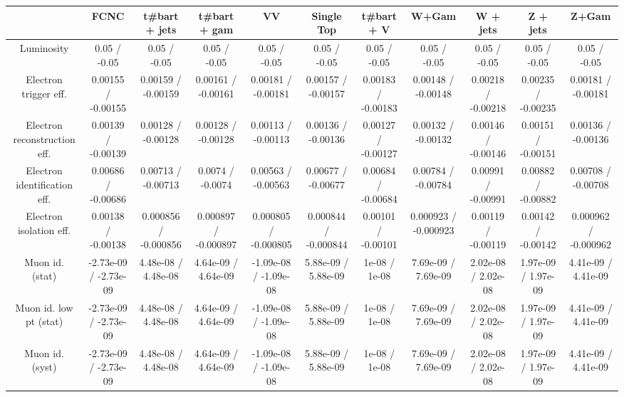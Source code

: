 \begin{table}[htbp]
\begin{center}
\footnotesize
\begin{tabular}{|c|c|c|c|c|c|c|c|c|c|c|}
\hline 
      & FCNC      & t#bar{t} + jets      & t#bar{t} +  gam      & VV      & Single Top      & t#bar{t} + V      & W+Gam      & W + jets      & Z + jets      & Z+Gam \\ 
\hline 
  Luminosity & 0.05 / -0.05 & 0.05 / -0.05 & 0.05 / -0.05 & 0.05 / -0.05 & 0.05 / -0.05 & 0.05 / -0.05 & 0.05 / -0.05 & 0.05 / -0.05 & 0.05 / -0.05 & 0.05 / -0.05 \\ 
  Electron trigger eff. & 0.00155 / -0.00155 & 0.00159 / -0.00159 & 0.00161 / -0.00161 & 0.00181 / -0.00181 & 0.00157 / -0.00157 & 0.00183 / -0.00183 & 0.00148 / -0.00148 & 0.00218 / -0.00218 & 0.00235 / -0.00235 & 0.00181 / -0.00181 \\ 
  Electron reconstruction eff. & 0.00139 / -0.00139 & 0.00128 / -0.00128 & 0.00128 / -0.00128 & 0.00113 / -0.00113 & 0.00136 / -0.00136 & 0.00127 / -0.00127 & 0.00132 / -0.00132 & 0.00146 / -0.00146 & 0.00151 / -0.00151 & 0.00136 / -0.00136 \\ 
  Electron identification eff. & 0.00686 / -0.00686 & 0.00713 / -0.00713 & 0.0074 / -0.0074 & 0.00563 / -0.00563 & 0.00677 / -0.00677 & 0.00684 / -0.00684 & 0.00784 / -0.00784 & 0.00991 / -0.00991 & 0.00882 / -0.00882 & 0.00708 / -0.00708 \\ 
  Electron isolation eff. & 0.00138 / -0.00138 & 0.000856 / -0.000856 & 0.000897 / -0.000897 & 0.000805 / -0.000805 & 0.000844 / -0.000844 & 0.00101 / -0.00101 & 0.000923 / -0.000923 & 0.00119 / -0.00119 & 0.00142 / -0.00142 & 0.000962 / -0.000962 \\ 
  Muon id. (stat) & -2.73e-09 / -2.73e-09 & 4.48e-08 / 4.48e-08 & 4.64e-09 / 4.64e-09 & -1.09e-08 / -1.09e-08 & 5.88e-09 / 5.88e-09 & 1e-08 / 1e-08 & 7.69e-09 / 7.69e-09 & 2.02e-08 / 2.02e-08 & 1.97e-09 / 1.97e-09 & 4.41e-09 / 4.41e-09 \\ 
  Muon id. low pt (stat) & -2.73e-09 / -2.73e-09 & 4.48e-08 / 4.48e-08 & 4.64e-09 / 4.64e-09 & -1.09e-08 / -1.09e-08 & 5.88e-09 / 5.88e-09 & 1e-08 / 1e-08 & 7.69e-09 / 7.69e-09 & 2.02e-08 / 2.02e-08 & 1.97e-09 / 1.97e-09 & 4.41e-09 / 4.41e-09 \\ 
  Muon id. (syst) & -2.73e-09 / -2.73e-09 & 4.48e-08 / 4.48e-08 & 4.64e-09 / 4.64e-09 & -1.09e-08 / -1.09e-08 & 5.88e-09 / 5.88e-09 & 1e-08 / 1e-08 & 7.69e-09 / 7.69e-09 & 2.02e-08 / 2.02e-08 & 1.97e-09 / 1.97e-09 & 4.41e-09 / 4.41e-09 \\ 

\end{tabular}
\end{center}
\end{table}
